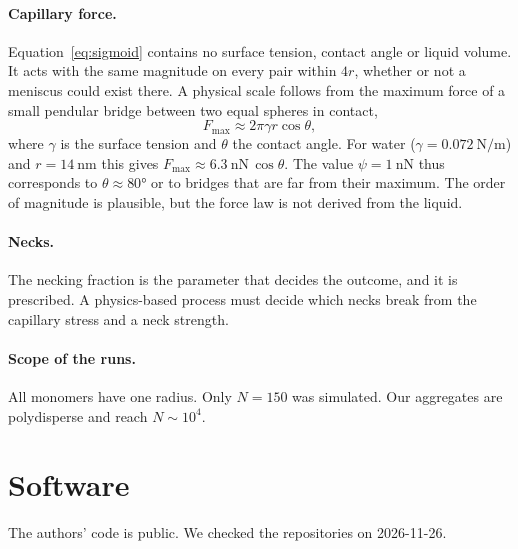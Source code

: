\documentclass[11pt,a4paper]{article}
\begin{document}
\paragraph{Capillary force.}
Equation~\eqref{eq:sigmoid} contains no surface tension, contact angle or liquid volume.
It acts with the same magnitude on every pair within $4r$, whether or not a meniscus could exist there.
A physical scale follows from the maximum force of a small pendular bridge between two equal spheres in contact,
\begin{equation}
  F_\text{max} \approx 2\pi \gamma r \cos\theta ,
  \label{eq:bridge-max}
\end{equation}
where $\gamma$ is the surface tension and $\theta$ the contact angle.
For water ($\gamma = \SI{0.072}{\newton\per\meter}$) and $r = \SI{14}{\nano\meter}$ this gives $F_\text{max} \approx \SI{6.3}{\nano\newton}\,\cos\theta$.
The value $\psi = \SI{1}{\nano\newton}$ thus corresponds to $\theta \approx \ang{80}$ or to bridges that are far from their maximum.
The order of magnitude is plausible, but the force law is not derived from the liquid.

\paragraph{Necks.}
The necking fraction is the parameter that decides the outcome, and it is prescribed.
A physics-based process must decide which necks break from the capillary stress and a neck strength.

\paragraph{Scope of the runs.}
All monomers have one radius.
Only $N = 150$ was simulated.
Our aggregates are polydisperse and reach $N \sim 10^4$.

\section{Software}
\label{sec:software}

The authors' code is public.
We checked the repositories on 2026-11-26.
\end{document}
